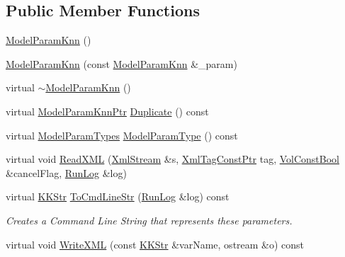 \subsection*{Public Member Functions}
\begin{DoxyCompactItemize}
\item 
\hyperlink{class_k_k_m_l_l_1_1_model_param_knn_ada71133c49e15ff6512899fd8d29bb41}{Model\+Param\+Knn} ()
\item 
\hyperlink{class_k_k_m_l_l_1_1_model_param_knn_a6e3c4712dd82d89727544936191aaf5b}{Model\+Param\+Knn} (const \hyperlink{class_k_k_m_l_l_1_1_model_param_knn}{Model\+Param\+Knn} \&\+\_\+param)
\item 
virtual \hyperlink{class_k_k_m_l_l_1_1_model_param_knn_a1cc0eac73865d61216880aac79926e81}{$\sim$\+Model\+Param\+Knn} ()
\item 
virtual \hyperlink{class_k_k_m_l_l_1_1_model_param_knn_a0cb141b4f25bad4ccd11ac5a62a2cf43}{Model\+Param\+Knn\+Ptr} \hyperlink{class_k_k_m_l_l_1_1_model_param_knn_acd8de939d1ede1e31e66a83fd8630be3}{Duplicate} () const 
\item 
virtual \hyperlink{class_k_k_m_l_l_1_1_model_param_a5984a5fe225fdbe8e40fb5ec746a42d0}{Model\+Param\+Types} \hyperlink{class_k_k_m_l_l_1_1_model_param_knn_abfa14324619827766614f240afd20144}{Model\+Param\+Type} () const 
\item 
virtual void \hyperlink{class_k_k_m_l_l_1_1_model_param_knn_a14eb1f88802c2aac4f2ed0a1f30cd3b3}{Read\+X\+ML} (\hyperlink{class_k_k_b_1_1_xml_stream}{Xml\+Stream} \&s, \hyperlink{namespace_k_k_b_a5f1b0b1667d79fec26deeff10c43df23}{Xml\+Tag\+Const\+Ptr} tag, \hyperlink{namespace_k_k_b_a7d390f568e2831fb76b86b56c87bf92f}{Vol\+Const\+Bool} \&cancel\+Flag, \hyperlink{class_k_k_b_1_1_run_log}{Run\+Log} \&log)
\item 
virtual \hyperlink{class_k_k_b_1_1_k_k_str}{K\+K\+Str} \hyperlink{class_k_k_m_l_l_1_1_model_param_knn_a12943afe052955e6f6fd212e9934c83e}{To\+Cmd\+Line\+Str} (\hyperlink{class_k_k_b_1_1_run_log}{Run\+Log} \&log) const 
\begin{DoxyCompactList}\small\item\em Creates a Command Line String that represents these parameters. \end{DoxyCompactList}\item 
virtual void \hyperlink{class_k_k_m_l_l_1_1_model_param_knn_a69fd33f58382121ab5137d6d912f2610}{Write\+X\+ML} (const \hyperlink{class_k_k_b_1_1_k_k_str}{K\+K\+Str} \&var\+Name, ostream \&o) const 
\end{DoxyCompactItemize}
